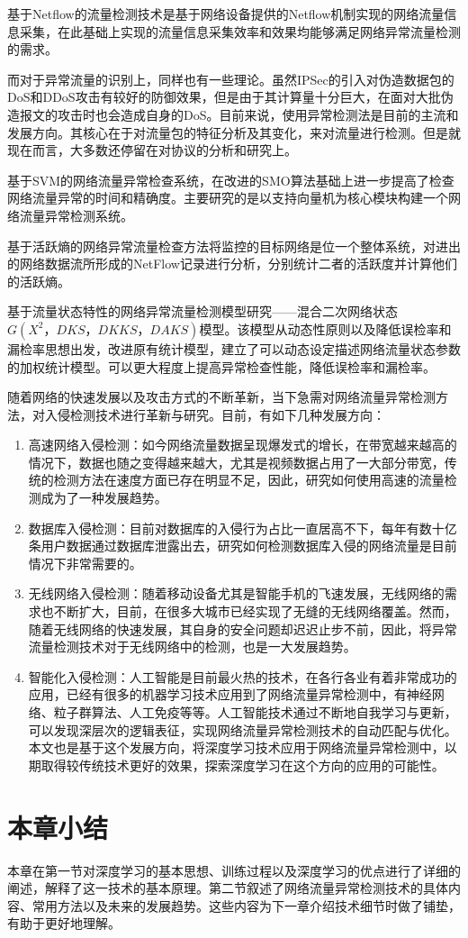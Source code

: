 基于Netflow的流量检测技术是基于网络设备提供的Netflow机制实现的网络流量信息采集，在此基础上实现的流量信息采集效率和效果均能够满足网络异常流量检测的需求。

而对于异常流量的识别上，同样也有一些理论。虽然IPSec的引入对伪造数据包的DoS和DDoS攻击有较好的防御效果，但是由于其计算量十分巨大，在面对大批伪造报文的攻击时也会造成自身的DoS。目前来说，使用异常检测法是目前的主流和发展方向。其核心在于对流量包的特征分析及其变化，来对流量进行检测。但是就现在而言，大多数还停留在对协议的分析和研究上。

基于SVM的网络流量异常检查系统，在改进的SMO算法基础上进一步提高了检查网络流量异常的时间和精确度。主要研究的是以支持向量机为核心模块构建一个网络流量异常检测系统。

基于活跃熵的网络异常流量检查方法将监控的目标网络是位一个整体系统，对进出的网络数据流所形成的NetFlow记录进行分析，分别统计二者的活跃度并计算他们的活跃熵。

基于流量状态特性的网络异常流量检测模型研究——混合二次网络状态$G(X^2，DKS，DKKS，DAKS)$模型。该模型从动态性原则以及降低误检率和漏检率思想出发，改进原有统计模型，建立了可以动态设定描述网络流量状态参数的加权统计模型。可以更大程度上提高异常检查性能，降低误检率和漏检率。

随着网络的快速发展以及攻击方式的不断革新，当下急需对网络流量异常检测方法，对入侵检测技术进行革新与研究。目前，有如下几种发展方向：
\begin{enumerate}
    \item 高速网络入侵检测：如今网络流量数据呈现爆发式的增长，在带宽越来越高的情况下，数据也随之变得越来越大，尤其是视频数据占用了一大部分带宽，传统的检测方法在速度方面已存在明显不足，因此，研究如何使用高速的流量检测成为了一种发展趋势。
    \item 数据库入侵检测：目前对数据库的入侵行为占比一直居高不下，每年有数十亿条用户数据通过数据库泄露出去，研究如何检测数据库入侵的网络流量是目前情况下非常需要的。
    \item 无线网络入侵检测：随着移动设备尤其是智能手机的飞速发展，无线网络的需求也不断扩大，目前，在很多大城市已经实现了无缝的无线网络覆盖。然而，随着无线网络的快速发展，其自身的安全问题却迟迟止步不前，因此，将异常流量检测技术对于无线网络中的检测，也是一大发展趋势。
    \item 智能化入侵检测：人工智能是目前最火热的技术，在各行各业有着非常成功的应用，已经有很多的机器学习技术应用到了网络流量异常检测中，有神经网络、粒子群算法、人工免疫等等。人工智能技术通过不断地自我学习与更新，可以发现深层次的逻辑表征，实现网络流量异常检测技术的自动匹配与优化。本文也是基于这个发展方向，将深度学习技术应用于网络流量异常检测中，以期取得较传统技术更好的效果，探索深度学习在这个方向的应用的可能性。
\end{enumerate}

\section{本章小结}

本章在第一节对深度学习的基本思想、训练过程以及深度学习的优点进行了详细的阐述，解释了这一技术的基本原理。第二节叙述了网络流量异常检测技术的具体内容、常用方法以及未来的发展趋势。这些内容为下一章介绍技术细节时做了铺垫，有助于更好地理解。
